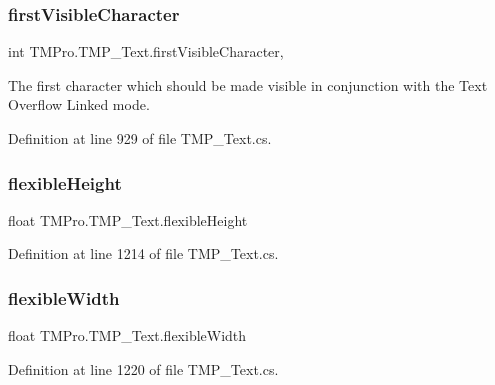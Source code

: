 \subsubsection{\texorpdfstring{firstVisibleCharacter}{firstVisibleCharacter}}
{\footnotesize\ttfamily int T\+M\+Pro.\+T\+M\+P\+\_\+\+Text.\+first\+Visible\+Character\hspace{0.3cm}{\ttfamily [get]}, {\ttfamily [set]}}



The first character which should be made visible in conjunction with the Text Overflow Linked mode. 



Definition at line 929 of file T\+M\+P\+\_\+\+Text.\+cs.

\mbox{\label{class_t_m_pro_1_1_t_m_p___text_a19b8af303698cfa8117dcac2381bca90}} 
\subsubsection{\texorpdfstring{flexibleHeight}{flexibleHeight}}
{\footnotesize\ttfamily float T\+M\+Pro.\+T\+M\+P\+\_\+\+Text.\+flexible\+Height\hspace{0.3cm}{\ttfamily [get]}}







Definition at line 1214 of file T\+M\+P\+\_\+\+Text.\+cs.

\mbox{\label{class_t_m_pro_1_1_t_m_p___text_a8be9f32bae4a94101351d359c926ed82}} 
\subsubsection{\texorpdfstring{flexibleWidth}{flexibleWidth}}
{\footnotesize\ttfamily float T\+M\+Pro.\+T\+M\+P\+\_\+\+Text.\+flexible\+Width\hspace{0.3cm}{\ttfamily [get]}}







Definition at line 1220 of file T\+M\+P\+\_\+\+Text.\+cs.

